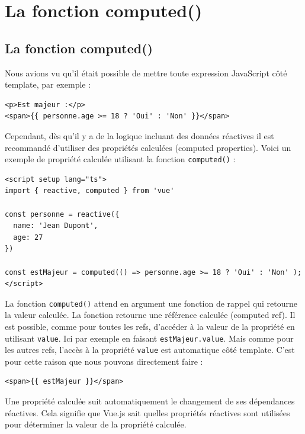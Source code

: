 \documentclass{article}
\begin{document}
\section{La fonction computed()}
\subsection{La fonction {\color{monOrange}computed()}}
Nous avions vu qu'il était possible de mettre toute expression JavaScript côté template, par exemple :
\begin{verbatim}
<p>Est majeur :</p>
<span>{{ personne.age >= 18 ? 'Oui' : 'Non' }}</span>
\end{verbatim}
Cependant, dès qu'il y a de la logique incluant des données réactives il est recommandé d'utiliser des propriétés calculées ({\color{monOrange}computed properties}). Voici un exemple de propriété calculée utilisant la fonction {\tt computed()} :
\begin{verbatim}
<script setup lang="ts">
import { reactive, computed } from 'vue'

const personne = reactive({
  name: 'Jean Dupont',
  age: 27
})

const estMajeur = computed(() => personne.age >= 18 ? 'Oui' : 'Non' );
</script>
\end{verbatim}
La fonction {\tt computed()}  attend en argument une fonction de rappel qui retourne la valeur calculée. La fonction retourne une référence calculée ({\color{monOrange}computed ref}). Il est possible, comme pour toutes les {\color{monOrange}refs}, d'accéder à la valeur de la propriété en utilisant {\tt value}. Ici par exemple en faisant {\tt estMajeur.value}. Mais comme pour les autres {\color{monOrange}refs}, l'accès à la propriété {\tt value} est automatique côté template. C'est pour cette raison que nous pouvons directement faire :
\begin{verbatim}
<span>{{ estMajeur }}</span>
\end{verbatim}
Une propriété calculée suit automatiquement le changement de ses dépendances réactives. Cela signifie que {\color{monOrange}Vue.js} sait quelles propriétés réactives sont utilisées pour déterminer la valeur de la propriété calculée.
\end{document}
